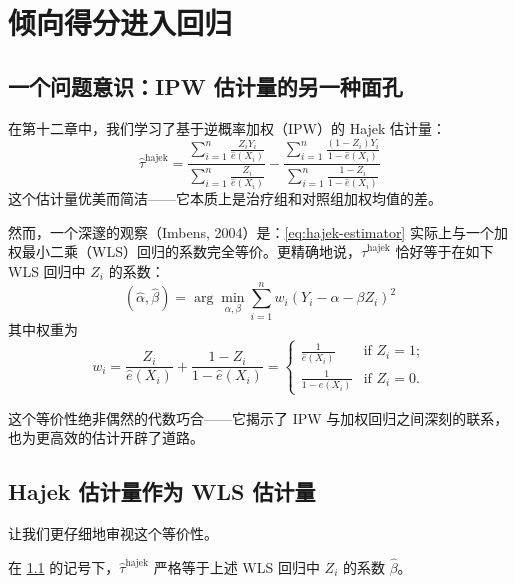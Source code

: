 
\chapter{倾向得分进入回归}\label{ch:14}

\section{一个问题意识：IPW 估计量的另一种面孔}\label{sec:14-1}

在第十二章中，我们学习了基于逆概率加权（IPW）的 Hajek 估计量：
\begin{equation}\label{eq:hajek-estimator}
\hat{\tau}^{\text{hajek}}
= \frac{\sum_{i=1}^n \frac{Z_i Y_i}{\hat{e}(X_i)}}{\sum_{i=1}^n \frac{Z_i}{\hat{e}(X_i)}}
  - \frac{\sum_{i=1}^n \frac{(1-Z_i)Y_i}{1-\hat{e}(X_i)}}{\sum_{i=1}^n \frac{1-Z_i}{1-\hat{e}(X_i)}}
\end{equation}
这个估计量优美而简洁——它本质上是治疗组和对照组加权均值的差。

然而，一个深邃的观察（Imbens, 2004）是：\cref{eq:hajek-estimator} 实际上与一个加权最小二乘（WLS）回归的系数完全等价。更精确地说，$\hat{\tau}^{\text{hajek}}$ 恰好等于在如下 WLS 回归中 $Z_i$ 的系数：
\[
(\hat{\alpha}, \hat{\beta}) = \arg\min_{\alpha,\beta} \sum_{i=1}^n w_i (Y_i - \alpha - \beta Z_i)^2
\]
其中权重为
\begin{equation}\label{eq:wls-weights-14.1}
w_i = \frac{Z_i}{\hat{e}(X_i)} + \frac{1-Z_i}{1-\hat{e}(X_i)}
= \begin{cases}
\frac{1}{\hat{e}(X_i)} & \text{if } Z_i = 1; \\[6pt]
\frac{1}{1-\hat{e}(X_i)} & \text{if } Z_i = 0.
\end{cases}
\end{equation}

这个等价性绝非偶然的代数巧合——它揭示了 IPW 与加权回归之间深刻的联系，也为更高效的估计开辟了道路。

\section{Hajek 估计量作为 WLS 估计量}\label{sec:14-2}

让我们更仔细地审视这个等价性。

\begin{Proposition}\label{prop:14.1}
在 \cref{sec:14-1} 的记号下，$\hat{\tau}^{\text{hajek}}$ 严格等于上述 WLS 回归中 $Z_i$ 的系数 $\hat{\beta}$。
\end{Proposition}

